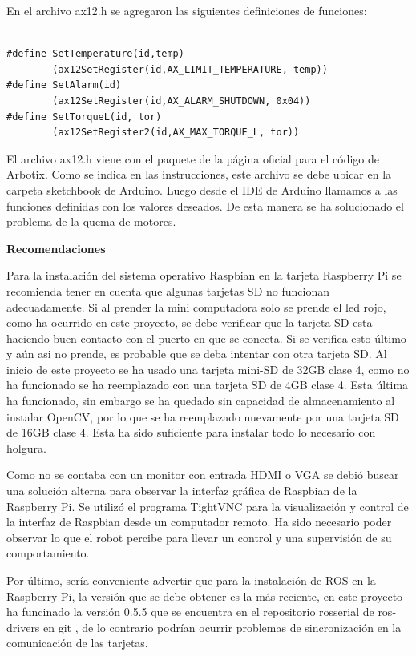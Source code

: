 \begin{itemize}
En el archivo ax12.h se agregaron las siguientes definiciones de funciones:

\begin{lstlisting}

#define SetTemperature(id,temp) 
		(ax12SetRegister(id,AX_LIMIT_TEMPERATURE, temp))
#define SetAlarm(id)
		(ax12SetRegister(id,AX_ALARM_SHUTDOWN, 0x04))
#define SetTorqueL(id, tor)
		(ax12SetRegister2(id,AX_MAX_TORQUE_L, tor)) 
\end{lstlisting}
 

El archivo ax12.h viene con el paquete de la p\'agina oficial para el código de Arbotix. Como se indica en las instrucciones, este archivo se debe ubicar en la carpeta sketchbook de Arduino. Luego desde el IDE de Arduino llamamos a las funciones definidas con los valores deseados. De esta manera se ha solucionado el problema de la quema de motores.

\end{itemize}

\textbf{Recomendaciones}  

Para la instalación del sistema operativo Raspbian en la tarjeta Raspberry Pi se recomienda tener en cuenta que algunas tarjetas \gls{SD} no funcionan adecuadamente. Si al prender la mini computadora solo se prende el led rojo, como ha ocurrido en este proyecto, se debe verificar que la tarjeta \gls{SD} esta haciendo buen contacto con el puerto en que se conecta. Si se verifica esto último y aún asi no prende, es probable que se deba intentar con otra tarjeta \gls{SD}. Al inicio de este proyecto se ha usado una tarjeta mini-\gls{SD} de 32GB clase 4, como no ha funcionado se ha reemplazado con una tarjeta \gls{SD} de 4GB clase 4. Esta última ha funcionado, sin embargo se ha quedado sin capacidad de almacenamiento al instalar OpenCV, por lo que se ha reemplazado nuevamente por una tarjeta \gls{SD} de 16GB clase 4. Esta ha sido suficiente para instalar todo lo necesario con holgura.    

Como no se contaba con un monitor con entrada \gls{HDMI} o \gls{VGA} se debió buscar una solución alterna para observar la interfaz gráfica de Raspbian de la Raspberry Pi. Se utilizó el programa \gls{TightVNC} para la visualización y control de la interfaz de Raspbian desde un computador remoto. Ha sido necesario poder observar lo que el robot percibe para llevar un control y una supervisión de su comportamiento. 

Por último, sería conveniente advertir que para la instalación de ROS en la Raspberry Pi, la versión que se debe obtener es la más reciente, en este proyecto ha funcinado la versión 0.5.5 que se encuentra en el repositorio rosserial de ros-drivers en git \cite{rosDrivers}, de lo contrario podrían ocurrir problemas de sincronización en la comunicación de las tarjetas.   



